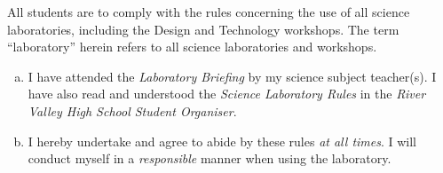 \documentclass[14pt,a4paper,oneside,openany,extrafontsizes,article]{memoir}
\begin{document}
\begin{center}
\end{center}

All students are to comply with the rules concerning the use of all science laboratories, including the Design and Technology workshops. The term ``laboratory'' herein refers to all science laboratories and workshops.

\begin{enumerate}[(a)]
\item I have attended the \emph{Laboratory Briefing} by my science subject teacher(s). I have also read and understood the \emph{Science Laboratory Rules} in the \emph{River Valley High School Student Organiser}.
\item I hereby undertake and agree to abide by these rules \emph{at all times}. I will conduct myself in a \emph{responsible} manner when using the laboratory.
\end{enumerate}
\end{document}
